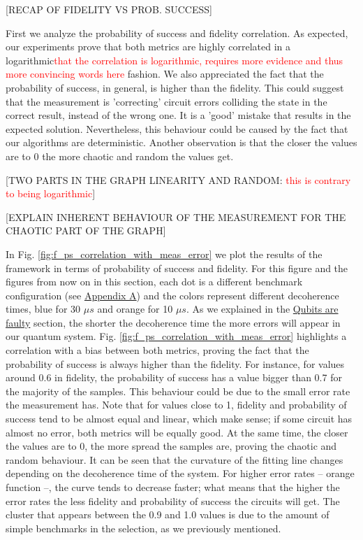 [RECAP OF FIDELITY VS PROB. SUCCESS]

First we analyze the probability of success and fidelity correlation.
As expected, our experiments prove that both metrics are highly correlated in a logarithmic\textcolor{red}{that the correlation is logarithmic, requires more evidence and thus more convincing words here} fashion.
We also appreciated the fact that the probability of success, in general, is higher than the fidelity.
This could suggest that the measurement is 'correcting' circuit errors colliding the state in the correct result, instead of the wrong one.
It is a 'good' mistake that results in the expected solution.
Nevertheless, this behaviour could be caused by the fact that our algorithms are deterministic.
Another observation is that the closer the values are to 0 the more chaotic and random the values get.



[TWO PARTS IN THE GRAPH  LINEARITY AND RANDOM: \textcolor{red}{this is contrary to being logarithmic}]

[EXPLAIN INHERENT BEHAVIOUR OF THE MEASUREMENT FOR THE CHAOTIC PART OF THE GRAPH]

In Fig. \ref{fig:f_ps_correlation_with_meas_error} we plot the results of the framework in terms of probability of success and fidelity. 
For this figure and the figures from now on in this section, each dot is a different benchmark configuration (see \href{appendix-1.org}{Appendix A}) and the colors represent different decoherence times, blue for 30 \(\mu s\) and orange for 10 \(\mu s\).
As we explained in the \href{quantum_computing.org}{Qubits are faulty} section, the shorter the decoherence time the more errors will appear in our quantum system.
Fig. \ref{fig:f_ps_correlation_with_meas_error} highlights a correlation with a bias between both metrics, proving the fact that the probability of success is always higher than the fidelity.
For instance, for values around 0.6 in fidelity, the probability of success has a value bigger than 0.7 for the majority of the samples.
This behaviour could be due to the small error rate the measurement has.
Note that for values close to 1, fidelity and probability of success tend to be almost equal and linear, which make sense; if some circuit has almost no error, both metrics will be equally good.
At the same time, the closer the values are to 0, the more spread the samples are, proving the chaotic and random behaviour.
It can be seen that the curvature of the fitting line changes depending on the decoherence time of the system.
For higher error rates -- orange function --, the curve tends to decrease faster; what means that the higher the error rates the less fidelity and probability of success the circuits will get.
The cluster that appears between the 0.9 and 1.0 values is due to the amount of simple benchmarks in the selection, as we previously mentioned.


